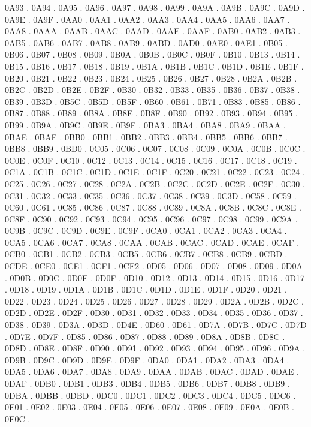 0A93 .
0A94 .
0A95 .
0A96 .
0A97 .
0A98 .
0A99 .
0A9A .
0A9B .
0A9C .
0A9D .
0A9E .
0A9F .
0AA0 .
0AA1 .
0AA2 .
0AA3 .
0AA4 .
0AA5 .
0AA6 .
0AA7 .
0AA8 .
0AAA .
0AAB .
0AAC .
0AAD .
0AAE .
0AAF .
0AB0 .
0AB2 .
0AB3 .
0AB5 .
0AB6 .
0AB7 .
0AB8 .
0AB9 .
0ABD .
0AD0 .
0AE0 .
0AE1 .
0B05 .
0B06 .
0B07 .
0B08 .
0B09 .
0B0A .
0B0B .
0B0C .
0B0F .
0B10 .
0B13 .
0B14 .
0B15 .
0B16 .
0B17 .
0B18 .
0B19 .
0B1A .
0B1B .
0B1C .
0B1D .
0B1E .
0B1F .
0B20 .
0B21 .
0B22 .
0B23 .
0B24 .
0B25 .
0B26 .
0B27 .
0B28 .
0B2A .
0B2B .
0B2C .
0B2D .
0B2E .
0B2F .
0B30 .
0B32 .
0B33 .
0B35 .
0B36 .
0B37 .
0B38 .
0B39 .
0B3D .
0B5C .
0B5D .
0B5F .
0B60 .
0B61 .
0B71 .
0B83 .
0B85 .
0B86 .
0B87 .
0B88 .
0B89 .
0B8A .
0B8E .
0B8F .
0B90 .
0B92 .
0B93 .
0B94 .
0B95 .
0B99 .
0B9A .
0B9C .
0B9E .
0B9F .
0BA3 .
0BA4 .
0BA8 .
0BA9 .
0BAA .
0BAE .
0BAF .
0BB0 .
0BB1 .
0BB2 .
0BB3 .
0BB4 .
0BB5 .
0BB6 .
0BB7 .
0BB8 .
0BB9 .
0BD0 .
0C05 .
0C06 .
0C07 .
0C08 .
0C09 .
0C0A .
0C0B .
0C0C .
0C0E .
0C0F .
0C10 .
0C12 .
0C13 .
0C14 .
0C15 .
0C16 .
0C17 .
0C18 .
0C19 .
0C1A .
0C1B .
0C1C .
0C1D .
0C1E .
0C1F .
0C20 .
0C21 .
0C22 .
0C23 .
0C24 .
0C25 .
0C26 .
0C27 .
0C28 .
0C2A .
0C2B .
0C2C .
0C2D .
0C2E .
0C2F .
0C30 .
0C31 .
0C32 .
0C33 .
0C35 .
0C36 .
0C37 .
0C38 .
0C39 .
0C3D .
0C58 .
0C59 .
0C60 .
0C61 .
0C85 .
0C86 .
0C87 .
0C88 .
0C89 .
0C8A .
0C8B .
0C8C .
0C8E .
0C8F .
0C90 .
0C92 .
0C93 .
0C94 .
0C95 .
0C96 .
0C97 .
0C98 .
0C99 .
0C9A .
0C9B .
0C9C .
0C9D .
0C9E .
0C9F .
0CA0 .
0CA1 .
0CA2 .
0CA3 .
0CA4 .
0CA5 .
0CA6 .
0CA7 .
0CA8 .
0CAA .
0CAB .
0CAC .
0CAD .
0CAE .
0CAF .
0CB0 .
0CB1 .
0CB2 .
0CB3 .
0CB5 .
0CB6 .
0CB7 .
0CB8 .
0CB9 .
0CBD .
0CDE .
0CE0 .
0CE1 .
0CF1 .
0CF2 .
0D05 .
0D06 .
0D07 .
0D08 .
0D09 .
0D0A .
0D0B .
0D0C .
0D0E .
0D0F .
0D10 .
0D12 .
0D13 .
0D14 .
0D15 .
0D16 .
0D17 .
0D18 .
0D19 .
0D1A .
0D1B .
0D1C .
0D1D .
0D1E .
0D1F .
0D20 .
0D21 .
0D22 .
0D23 .
0D24 .
0D25 .
0D26 .
0D27 .
0D28 .
0D29 .
0D2A .
0D2B .
0D2C .
0D2D .
0D2E .
0D2F .
0D30 .
0D31 .
0D32 .
0D33 .
0D34 .
0D35 .
0D36 .
0D37 .
0D38 .
0D39 .
0D3A .
0D3D .
0D4E .
0D60 .
0D61 .
0D7A .
0D7B .
0D7C .
0D7D .
0D7E .
0D7F .
0D85 .
0D86 .
0D87 .
0D88 .
0D89 .
0D8A .
0D8B .
0D8C .
0D8D .
0D8E .
0D8F .
0D90 .
0D91 .
0D92 .
0D93 .
0D94 .
0D95 .
0D96 .
0D9A .
0D9B .
0D9C .
0D9D .
0D9E .
0D9F .
0DA0 .
0DA1 .
0DA2 .
0DA3 .
0DA4 .
0DA5 .
0DA6 .
0DA7 .
0DA8 .
0DA9 .
0DAA .
0DAB .
0DAC .
0DAD .
0DAE .
0DAF .
0DB0 .
0DB1 .
0DB3 .
0DB4 .
0DB5 .
0DB6 .
0DB7 .
0DB8 .
0DB9 .
0DBA .
0DBB .
0DBD .
0DC0 .
0DC1 .
0DC2 .
0DC3 .
0DC4 .
0DC5 .
0DC6 .
0E01 .
0E02 .
0E03 .
0E04 .
0E05 .
0E06 .
0E07 .
0E08 .
0E09 .
0E0A .
0E0B .
0E0C .

